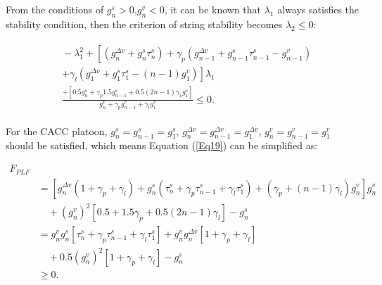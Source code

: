 \documentclass[journal]{IEEEtran}
\begin{document}
From the conditions of $g_n^s>0$,$g_n^v<0$, it can be known that $\lambda_1$ always satisfies the stability condition, then the criterion of string stability becomes $\lambda_2\leq0$:




\begin{equation}
\begin{gathered}
\begin{aligned}
&\!-\!\lambda_{1}^{2}\!+\!\left[\left(g_{n}^{\Delta v}\!+\!g_{n}^{s} \tau_{n}^{s}\right)\!+\!\gamma_{p}\left(g_{n\!-\!1}^{\Delta v}\!+\!g_{n\!-\!1}^{s} \tau_{n\!-\!1}^{s}\!-\!g_{n\!-\!1}^{v}\right)\right. \\
&\left.+\gamma_{l}\left(g_{1}^{\Delta v}\!+\!g_{1}^{s} \tau_{1}^{s}\!-\!(n\!-\!1) g_{1}^{v}\right)\right] \lambda_{1} \\
&\frac{+\left[0.5 g_{n}^{s}\!+\!\gamma_{p} 1.5 g_{n\!-\!1}^{s}\!+\!0.5(2 n\!-\!1) \gamma_{1} g_{1}^{s}\right]}{g_{n}^{v}\!+\!\gamma_{p} g_{n\!-\!1}^{v}\!+\!\gamma_{l} g_{1}^{v}} \leq 0 .
\end{aligned}
\end{gathered}
\label{Eq19}
\end{equation}


For the CACC platoon, $g_n^s=g_{n-1}^s=g_1^s$, $g_n^{\Delta v}=g_{n-1}^{\Delta v}=g_1^{\Delta v}$, $g_n^v=g_{n-1}^v=g_1^v$ should be satisfied, which means Equation (\ref{Eq19}) can be simplified as:

\begin{small}
\begin{equation}
\begin{aligned}
F_{PLF}\\
&=\left[g_{n}^{\Delta v}\left(1\!+\!\gamma_{p}\!+\!\gamma_{l}\right)\!+\!g_{n}^{s}\left(\tau_{n}^{s}\!+\!\gamma_{p} \tau_{n\!-\!1}^{s}\!+\!\gamma_{l} \tau_{1}^{s}\right)\!+\!\left(\gamma_{p}\!+\!(n\!\!-\!\!1) \gamma_{l}\right) g_{n}^{v}\right] g_{n}^{v} \\
& \quad+\!\left(g_{n}^{v}\right)^{2}\left[0.5\!+\!1.5 \gamma_{p}\!+\!0.5(2 n\!-\!1) \gamma_{l}\right]\!\!-\!g_{n}^{s}\! \\
&=g_{n}^{v} g_{n}^{s}\left[\tau_{n}^{s}\!+\!\gamma_{p} \tau_{n\!-\!1}^{s}\!+\!\gamma_{l} \tau_{1}^{s}\right]\!+\!g_{n}^{v} g_{n}^{\Delta v}\left[1\!+\!\gamma_{p}\!+\!\gamma_{l}\right] \\
& \quad \!+\!0.5\left(g_{n}^{v}\right)^{2}\left[1\!+\!\gamma_{p}\!+\!\gamma_{l}\right]\!-\!g_{n}^{s} \\
&\geq 0.
\end{aligned}
\label{Eq70}
\end{equation}

\end{small}
\end{document}
